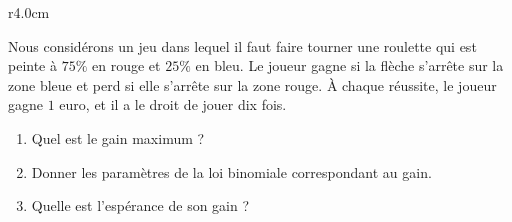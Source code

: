 
\begin{exercice}\label{exoPremiere-0094}


\begin{wrapfigure}{r}{4.0cm}
   \vspace{-0.5cm}        %
   \centering
   
\end{wrapfigure}
   Nous considérons un jeu dans lequel il faut faire tourner une roulette qui est peinte à \( 75\%\) en rouge et \( 25\%\) en bleu.  Le joueur gagne si la flèche s'arrête sur la zone bleue et perd si elle s'arrête sur la zone rouge. À chaque réussite, le joueur gagne \( 1\) euro, et il a le droit de jouer dix fois.

   \begin{enumerate}
       \item
           Quel est le gain maximum ?
       \item
           Donner les paramètres de la loi binomiale correspondant au gain.
       \item
           Quelle est l'espérance de son gain ?
   \end{enumerate}

\end{exercice}
